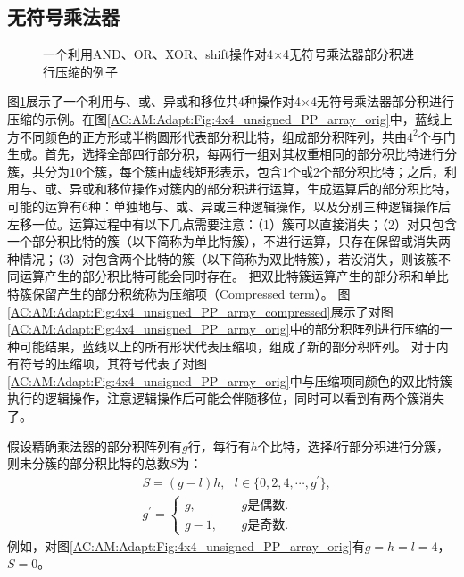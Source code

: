\subsection{无符号乘法器}
\begin{figure}[ht]
    \centering
    \caption{一个利用AND、OR、XOR、shift操作对4$\times$4无符号乘法器部分积进行压缩的例子}
    \label{AC:AM:Adapt:Fig:4x4_unsigned}
\end{figure}

图\ref{AC:AM:Adapt:Fig:4x4_unsigned}展示了一个利用与、或、异或和移位共4种操作对4$\times$4无符号乘法器部分积进行压缩的示例。在图\ref{AC:AM:Adapt:Fig:4x4_unsigned_PP_array_orig}中，蓝线上方不同颜色的正方形或半椭圆形代表部分积比特，组成部分积阵列，共由$4^2$个与门生成。首先，选择全部四行部分积，每两行一组对其权重相同的部分积比特进行分簇，共分为10个簇，每个簇由虚线矩形表示，包含1个或2个部分积比特；之后，利用与、或、异或和移位操作对簇内的部分积进行运算，生成运算后的部分积比特，可能的运算有6种：单独地与、或、异或三种逻辑操作，以及分别三种逻辑操作后左移一位。运算过程中有以下几点需要注意：（1）簇可以直接消失；（2）对只包含一个部分积比特的簇（以下简称为单比特簇），不进行运算，只存在保留或消失两种情况；（3）对包含两个比特的簇（以下简称为双比特簇），若没消失，则该簇不同运算产生的部分积比特可能会同时存在。
把双比特簇运算产生的部分积和单比特簇保留产生的部分积统称为压缩项（Compressed term）。
图\ref{AC:AM:Adapt:Fig:4x4_unsigned_PP_array_compressed}展示了对图\ref{AC:AM:Adapt:Fig:4x4_unsigned_PP_array_orig}中的部分积阵列进行压缩的一种可能结果，蓝线以上的所有形状代表压缩项，组成了新的部分积阵列。
对于内有符号的压缩项，其符号代表了对图\ref{AC:AM:Adapt:Fig:4x4_unsigned_PP_array_orig}中与压缩项同颜色的双比特簇执行的逻辑操作，注意逻辑操作后可能会伴随移位，同时可以看到有两个簇消失了。

假设精确乘法器的部分积阵列有$g$行，每行有$h$个比特，选择$l$行部分积进行分簇，则未分簇的部分积比特的总数$S$为：
\begin{align}
        & S = ( g - l ) h, \ \ \ l \in \{0, 2, 4, \cdots, g^{\prime} \} \label{AC:AM:Adapt:Eq:unsigned_S}, \\
        & g^{\prime} = \left\{
    \begin{aligned}
      g, \ \ \  & \ \ \ \ \ g \text{是偶数}. \\
      g - 1, & \ \ \ \ \ g \text{是奇数}.
    \end{aligned}
  \right.
  \label{AC:AM:Adapt:Eq:unsigned_g}
\end{align}
例如，对图\ref{AC:AM:Adapt:Fig:4x4_unsigned_PP_array_orig}有$g=h=l=4$，$S=0$。

